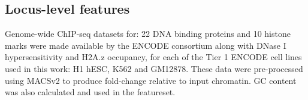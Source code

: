 \documentclass[a4paper,10pt,oneside]{book}
\begin{document}
\subsection{Locus-level features}\label{locus-level-features}

Genome-wide ChIP-seq datasets for: 22 DNA binding proteins and 10
histone marks were made available by the ENCODE
consortium\citep{Dunham2012, Boyle2014} along with DNase I
hypersensitivity and H2A.z occupancy, for each of the Tier 1 ENCODE cell
lines used in this work: H1 hESC, K562 and GM12878. These data were
pre-processed using MACSv2\citep{Zhang2008} to produce fold-change
relative to input chromatin. GC content was also calculated and used in
the featureset.

%
%
%
%
\end{document}
